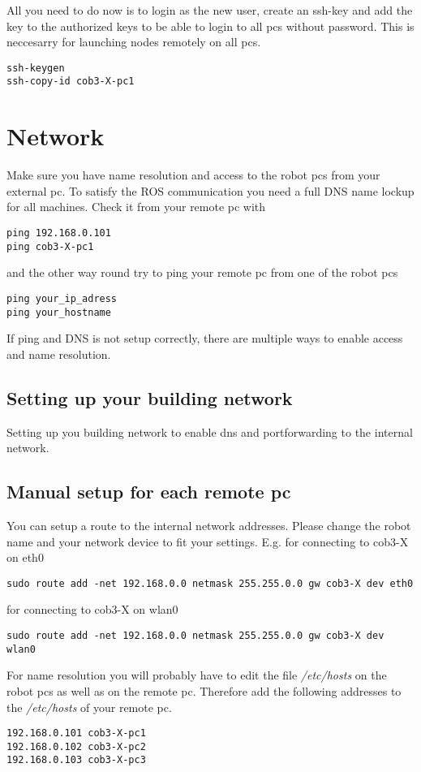 All you need to do now is to login as the new user, create an ssh-key and add the key to the authorized keys to be able to login to all pcs without password. This is neccesarry for launching nodes remotely on all pcs.
\begin{lstlisting}
ssh-keygen
ssh-copy-id cob3-X-pc1
\end{lstlisting}


\section{Network}
Make sure you have name resolution and access to the robot pcs from your external pc. To satisfy the ROS communication you need a full DNS name lockup for all machines. Check it from your remote pc with
\begin{lstlisting}
ping 192.168.0.101
ping cob3-X-pc1
\end{lstlisting}
and the other way round try to ping your remote pc from one of the robot pcs
\begin{lstlisting}
ping your_ip_adress
ping your_hostname
\end{lstlisting}

If ping and DNS is not setup correctly, there are multiple ways to enable access and name resolution.

\subsection{Setting up your building network}
Setting up you building network to enable dns and portforwarding to the internal network.

\subsection{Manual setup for each remote pc}
You can setup a route to the internal network addresses. Please change the robot name and your network device to fit your settings. E.g. for connecting to cob3-X on eth0
\begin{lstlisting}
sudo route add -net 192.168.0.0 netmask 255.255.0.0 gw cob3-X dev eth0
\end{lstlisting}

for connecting to cob3-X on wlan0
\begin{lstlisting}
sudo route add -net 192.168.0.0 netmask 255.255.0.0 gw cob3-X dev wlan0
\end{lstlisting}


For name resolution you will probably have to edit the file \textit{/etc/hosts} on the robot pcs as well as on the remote pc. Therefore add the following addresses to the \textit{/etc/hosts} of your remote pc.
\begin{lstlisting}
192.168.0.101 cob3-X-pc1
192.168.0.102 cob3-X-pc2
192.168.0.103 cob3-X-pc3
\end{lstlisting}

